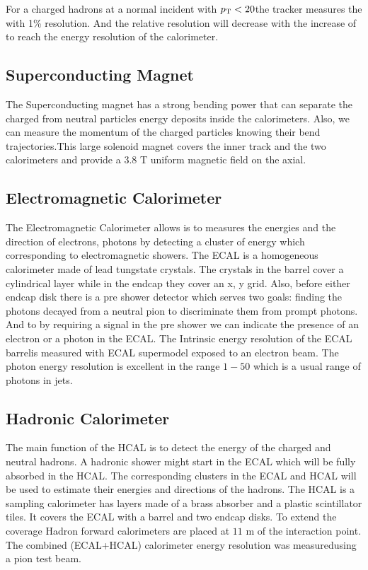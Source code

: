 For a charged hadrons at a normal incident with $p_{\mathrm{T}} < 20$\GeV the tracker measures the \pt with 1\% resolution. And the relative resolution will decrease with the increase of \pt to reach the energy resolution of the calorimeter.

\subsection{Superconducting Magnet}

The Superconducting magnet has a strong bending power that can separate the charged from neutral particles energy deposits inside the calorimeters. Also, we can measure the momentum of the charged particles knowing their bend trajectories.This large solenoid magnet covers the inner track and the two calorimeters and provide a $3.8$ T uniform magnetic field on the axial.

\subsection{Electromagnetic Calorimeter}

The Electromagnetic Calorimeter allows is to measures the energies and the direction of electrons, photons by detecting a cluster of energy which corresponding to electromagnetic showers. The ECAL is a homogeneous calorimeter made of lead tungstate crystals. The crystals in the barrel cover a cylindrical layer while in the endcap they cover an x, y grid. Also, before either endcap disk there is a pre shower detector which serves two goals: finding the photons decayed from a neutral pion to discriminate them from prompt photons. And to by requiring a signal in the pre shower we can indicate the presence of an electron or a photon in the ECAL. The Intrinsic energy resolution of the ECAL barrelis measured with ECAL supermodel exposed to an electron beam. The photon energy resolution is excellent in the range $1-50$ \GeV which is a usual range of photons in jets.


\subsection{Hadronic Calorimeter}

The main function of the HCAL is to detect the energy of the charged and neutral hadrons. A hadronic shower might start in the ECAL which will be fully absorbed in the HCAL. The corresponding clusters in the ECAL and  HCAL will be used to estimate their energies and directions of the hadrons. The HCAL is a sampling calorimeter has layers made of a brass absorber and a plastic scintillator tiles. It covers the ECAL with a barrel and two endcap disks. To extend the coverage Hadron forward calorimeters are placed at $11$ m of the interaction point. The combined (ECAL+HCAL) calorimeter energy resolution was measuredusing a pion test beam.





